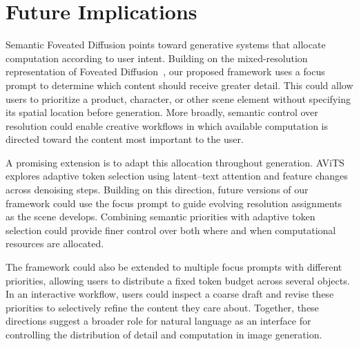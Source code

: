 \documentclass[11pt]{article}
\begin{document}
\section{Future Implications}

Semantic Foveated Diffusion points toward generative systems that allocate computation according to user intent. Building on the mixed-resolution representation of Foveated Diffusion~\cite{chao2026foveated}, our proposed framework uses a focus prompt to determine which content should receive greater detail. This could allow users to prioritize a product, character, or other scene element without specifying its spatial location before generation. More broadly, semantic control over resolution could enable creative workflows in which available computation is directed toward the content most important to the user.

A promising extension is to adapt this allocation throughout generation. AViTS~\cite{qin2026avits} explores adaptive token selection using latent--text attention and feature changes across denoising steps. Building on this direction, future versions of our framework could use the focus prompt to guide evolving resolution assignments as the scene develops. Combining semantic priorities with adaptive token selection could provide finer control over both where and when computational resources are allocated.

The framework could also be extended to multiple focus prompts with different priorities, allowing users to distribute a fixed token budget across several objects. In an interactive workflow, users could inspect a coarse draft and revise these priorities to selectively refine the content they care about. Together, these directions suggest a broader role for natural language as an interface for controlling the distribution of detail and computation in image generation.



\end{document}
